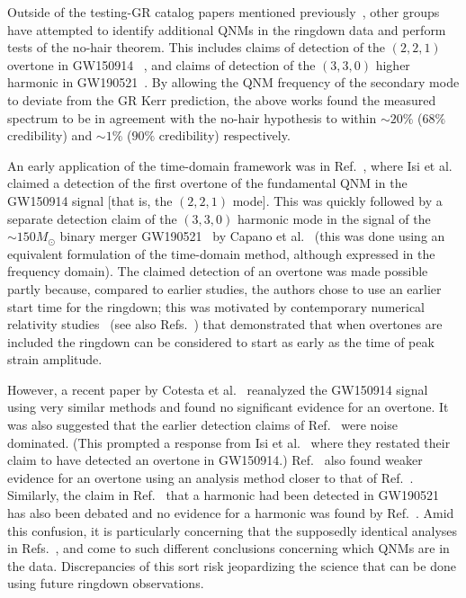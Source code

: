 Outside of the testing-GR catalog papers mentioned previously~\cite{LIGOScientific:2020tif, LIGOScientific:2021sio}, other groups have attempted to identify additional QNMs in the ringdown data and perform tests of the no-hair theorem. 
This includes claims of detection of the $(2,2,1)$ overtone in GW150914~\cite{Isi:2019aib} , and claims of detection of the $(3,3,0)$ higher harmonic in GW190521~\cite{Capano:2021etf}. 
By allowing the QNM frequency of the secondary mode to deviate from the GR Kerr prediction, the above works found the measured spectrum to be in agreement with the no-hair hypothesis to within $\sim 20\%$ ($68\%$ credibility) and $\sim 1\%$ ($90\%$ credibility) respectively.

An early application of the time-domain framework was in Ref.~\cite{Isi:2019aib}, where Isi et al. claimed a detection of the first overtone of the fundamental QNM in the GW150914 signal [that is, the $(2, 2, 1)$ mode]. 
This was quickly followed by a separate detection claim of the $(3,3,0)$ harmonic mode in the signal of the $\sim 150M_\odot$ binary merger GW190521~\cite{LIGOScientific:2020iuh} by Capano et al.~\cite{Capano:2021etf} (this was done using an equivalent formulation of the time-domain method, although expressed in the frequency domain).
The claimed detection of an overtone was made possible partly because, compared to earlier studies, the authors chose to use an earlier start time for the ringdown; this was motivated by contemporary numerical relativity studies~\cite{Giesler:2019uxc} (see also Refs.~\cite{Bhagwat:2019dtm, Ota:2019bzl, Cook:2020otn, JimenezForteza:2020cve, Dhani:2020nik, Finch:2021iip, Forteza:2021wfq, Dhani:2021vac, MaganaZertuche:2021syq}) that demonstrated that when overtones are included the ringdown can be considered to start as early as the time of peak strain amplitude. 

However, a recent paper by Cotesta et al.~\cite{Cotesta:2022pci} reanalyzed the GW150914 signal using very similar methods and found no significant evidence for an overtone.
It was also suggested that the earlier detection claims of Ref.~\cite{Isi:2019aib} were noise dominated.
(This prompted a response from Isi et al.~\cite{Isi:2022mhy} where they restated their claim to have detected an overtone in GW150914.) 
Ref.~\cite{Bustillo:2020buq} also found weaker evidence for an overtone using an analysis method closer to that of Ref.~\cite{LIGOScientific:2016lio}.
Similarly, the claim in Ref.~\cite{Capano:2021etf} that a harmonic had been detected in GW190521 has also been debated and no evidence for a harmonic was found by Ref.~\cite{LIGOScientific:2021sio}.
Amid this confusion, it is particularly concerning that the supposedly identical analyses in Refs.~\cite{Isi:2019aib, Isi:2022mhy}, and \cite{Cotesta:2022pci} come to such different conclusions concerning which QNMs are in the data. 
Discrepancies of this sort risk jeopardizing the science that can be done using future ringdown observations.

